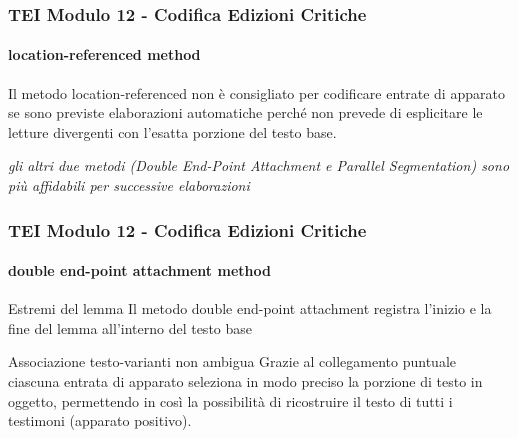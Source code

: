 \begin{frame}
    \frametitle{TEI Modulo 12 - Codifica Edizioni Critiche}
    \framesubtitle{location-referenced method}
    \addtocounter{nframe}{1}
    


    \begin{block}
       Il metodo location-referenced non è consigliato per codificare entrate di apparato se sono previste elaborazioni automatiche perché non prevede di esplicitare le letture divergenti con l'esatta porzione del testo base.
    \end{block}

    \begin{center}
        \textit{gli altri due metodi (Double End-Point Attachment e Parallel Segmentation) sono più affidabili per successive elaborazioni}
    \end{center}
    
\end{frame}



\begin{frame}
    \frametitle{TEI Modulo 12 - Codifica Edizioni Critiche}
    \framesubtitle{double end-point attachment method}
    \addtocounter{nframe}{1}
    



    \begin{block}{Estremi del lemma}
      Il metodo double end-point attachment registra l'inizio e la fine del lemma all'interno del testo base
    \end{block}
    
    \begin{block}{Associazione testo-varianti non ambigua}
        Grazie al collegamento puntuale ciascuna entrata di apparato seleziona in modo preciso la porzione di testo in oggetto, permettendo in così la possibilità di ricostruire il testo di tutti i testimoni (apparato positivo).
    \end{block}

\end{frame}




